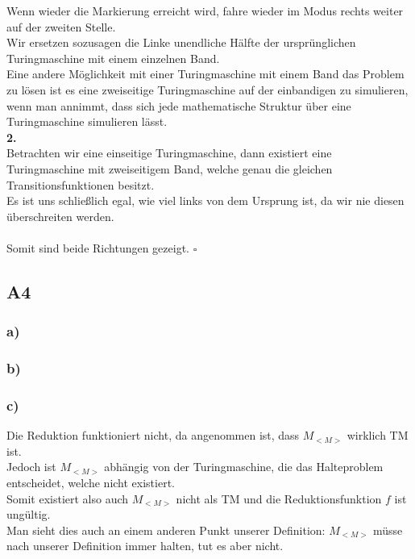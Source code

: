 \documentclass[12pt, a4paper]{article}
\newcommand*{\qed}{\null\nobreak\hfill\ensuremath{\square}}
\begin{document}
Wenn wieder die Markierung erreicht wird, fahre wieder im  Modus rechts weiter auf der zweiten Stelle. \\
Wir ersetzen sozusagen die Linke unendliche Hälfte der ursprünglichen Turingmaschine mit einem einzelnen Band. \\
Eine andere Möglichkeit mit einer Turingmaschine mit einem Band das Problem zu lösen ist es eine zweiseitige Turingmaschine auf der einbandigen zu simulieren, wenn man annimmt, dass sich jede mathematische Struktur über eine Turingmaschine simulieren lässt.\\
\textbf{2. } \textquote{\(\Leftarrow\)} \\
Betrachten wir eine einseitige Turingmaschine, dann existiert eine Turingmaschine mit zweiseitigem Band, welche genau die gleichen Transitionsfunktionen besitzt. \\
Es ist uns schließlich egal, wie viel  links von dem Ursprung ist, da wir nie diesen überschreiten werden. \\
\\
Somit sind beide Richtungen gezeigt. \qed
\subsection*{A4}
\subsubsection*{a)}
\subsubsection*{b)}
\subsubsection*{c)}
Die Reduktion funktioniert nicht, da angenommen ist, dass \(M_{<M>}\) wirklich TM ist. \\
Jedoch ist \(M_{<M>}\) abhängig von der Turingmaschine, die das Halteproblem entscheidet, welche nicht existiert. \\
Somit existiert also auch \(M_{<M>}\) nicht als TM und die Reduktionsfunktion \(f\) ist ungültig. \\
Man sieht dies auch an einem anderen Punkt unserer Definition: \(M_{<M>}\) müsse nach unserer Definition immer halten, tut es aber nicht.
\end{document}
